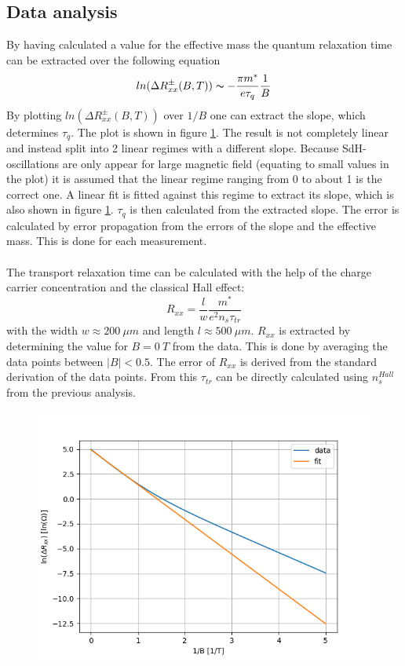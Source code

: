 \documentclass[12pt,a4paper]{article}
\begin{document}
\subsection{Data analysis}
By having calculated a value for the effective mass the quantum relaxation time can be extracted over the following equation
\begin{equation}
ln(\Delta R_{xx}^{\pm}(B,T)) \thicksim -\dfrac{\pi m^*}{e \tau_q} \dfrac{1}{B}
\end{equation} 
By plotting $ln(\Delta R_{xx}^{\pm}(B,T))$ over $1/B$ one can extract the slope, which determines $\tau_q$. The plot is shown in figure \ref{fig:tau}. The result is not completely linear and instead split into 2 linear regimes with a different slope. Because SdH-oscillations are only appear for large magnetic field (equating to small values in the plot) it is assumed that the linear regime ranging from 0 to about 1 is the correct one. A linear fit is fitted against this regime to extract its slope, which is also shown in figure \ref{fig:tau}. $\tau_q$ is then calculated from the extracted slope. The error is calculated by error propagation from the errors of the slope and the effective mass. This is done for each measurement.\\
\\
The transport relaxation time can be calculated with the help of the charge carrier concentration and the classical Hall effect:
\begin{equation}
R_{xx} = \dfrac{l}{w} \dfrac{m^*}{e^2 n_s \tau_{tr}}
\end{equation}
with the width $w \approx \SI{200}{\mu m}$ and length $l \approx \SI{500}{\mu m}$.
$R_{xx}$ is extracted by determining the value for $B = \SI{0}{T}$ from the data. This is done by averaging the data points between $|B|<0.5$. The error of $R_{xx}$ is derived from the standard derivation of the data points. From this $\tau_{tr}$ can be directly calculated using $n_s^{Hall}$ from the previous analysis.


\begin{figure}
\centering
\includegraphics[scale=0.8]{Bilder/tau.png}
\caption{}
\label{fig:tau}
\end{figure}
\end{document}
